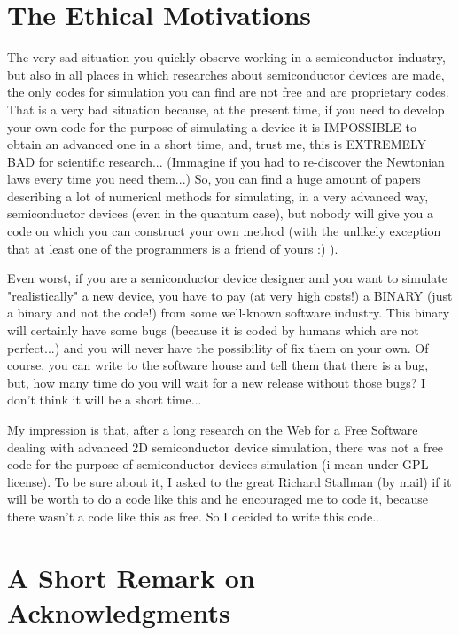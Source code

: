 \documentclass[12pt]{book}
\begin{document}
\section{The Ethical Motivations}
The very sad situation you quickly observe working in a semiconductor industry, but also in all places in which researches about semiconductor devices are made, the only codes for simulation you can find are not free and are proprietary codes. That is a very bad situation because, at the present time, if you need to develop your own code for the purpose of simulating a device it is IMPOSSIBLE to obtain an advanced one in a short time, and, trust me, this is EXTREMELY BAD for scientific research... (Immagine if you had to re-discover the Newtonian laws every time you need them...) So, you can find a huge amount of papers describing a lot of numerical methods for simulating, in a very advanced way, semiconductor devices (even in the quantum case), but nobody will give you a code on which you can construct your own method (with the unlikely exception that at least one of the programmers is a friend of yours :) ).

Even worst, if you are a semiconductor device designer and you want to simulate "realistically" a new device, you have to pay (at very high costs!) a BINARY (just a binary and not the code!) from some well-known software industry. This binary will certainly have some bugs (because it is coded by humans which are not perfect...) and you will never have the possibility of fix them on your own. Of course, you can write to the software house and tell them that there is a bug, but, how many time do you will wait for a new release without those bugs? I don't think it will be a short time...

My impression is that, after a long research on the Web for a Free Software dealing with advanced 2D semiconductor device simulation, there was not a free code for the purpose of semiconductor devices simulation (i mean under GPL license). To be sure about it, I asked to the great Richard Stallman (by mail) if it will be worth to do a code like this and he encouraged me to code it, because there wasn't a code like this as free. So I decided to write this code.. 

\section{A Short Remark on Acknowledgments}
\end{document}
